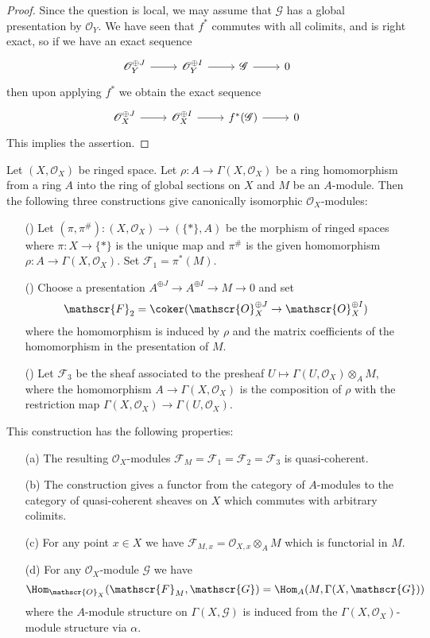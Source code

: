 \begin{proof}
Since the question is local, we may assume that $\mathscr{G}$ has a global presentation by $\mathscr{O}_Y$. We have seen that $f^*$ commutes with all colimits, and is right exact, so if we have an exact sequence
\[\begin{tikzcd}
\mathscr{O}_Y^{\oplus J}\ar[r]&\mathscr{O}_Y^{\oplus I}\ar[r]&\mathscr{G}\ar[r]&0
\end{tikzcd}\]
then upon applying $f^*$ we obtain the exact sequence
\[\begin{tikzcd}
\mathscr{O}_X^{\oplus J}\ar[r]&\mathscr{O}_X^{\oplus I}\ar[r]&f^*(\mathscr{G})\ar[r]&0
\end{tikzcd}\]
This implies the assertion.
\end{proof}
\begin{proposition}\label{qcoh module associated with a module}
Let $(X,\mathscr{O}_X)$ be ringed space. Let $\rho:A\to\Gamma(X,\mathscr{O}_X)$ be a ring homomorphism from a ring $A$ into the ring of global sections on $X$ and $M$ be an $A$-module. Then the following three constructions give canonically isomorphic $\mathscr{O}_X$-modules:
\begin{itemize}
\item[(\rmnum{1})] Let $(\pi,\pi^{\#}):(X,\mathscr{O}_X)\to(\{\ast\},A)$ be the morphism of ringed spaces where $\pi:X\to\{\ast\}$ is the unique map and $\pi^{\#}$ is the given homomorphism $\rho:A\to\Gamma(X,\mathscr{O}_X)$. Set $\mathscr{F}_1=\pi^*(M)$.
\item[(\rmnum{2})] Choose a presentation $A^{\oplus J}\to A^{\oplus I}\to M\to 0$ and set
\[\mathscr{F}_2=\coker(\mathscr{O}_X^{\oplus J}\to\mathscr{O}_X^{\oplus I})\]
where the homomorphism is induced by $\rho$ and the matrix coefficients of the homomorphism in the presentation of $M$.
\item[(\rmnum{3})] Let $\mathscr{F}_3$ be the sheaf associated to the presheaf $U\mapsto\Gamma(U,\mathscr{O}_X)\otimes_AM$, where the homomorphism $A\to\Gamma(X,\mathscr{O}_X)$ is the composition of $\rho$ with the restriction map $\Gamma(X,\mathscr{O}_X)\to\Gamma(U,\mathscr{O}_X)$.
\end{itemize}
This construction has the following properties:
\begin{itemize}
\item[(a)] The resulting $\mathscr{O}_X$-modules $\mathscr{F}_M=\mathscr{F}_1=\mathscr{F}_2=\mathscr{F}_3$ is quasi-coherent.
\item[(b)] The construction gives a functor from the category of $A$-modules to the category of quasi-coherent sheaves on $X$ which commutes with arbitrary colimits.
\item[(c)] For any point $x\in X$ we have $\mathscr{F}_{M,x}=\mathscr{O}_{X,x}\otimes_AM$ which is functorial in $M$.
\item[(d)] For any $\mathscr{O}_X$-module $\mathscr{G}$ we have
\[\Hom_{\mathscr{O}_X}(\mathscr{F}_M,\mathscr{G})=\Hom_A(M,\Gamma(X,\mathscr{G}))\]
where the $A$-module structure on $\Gamma(X,\mathscr{G})$ is induced from the $\Gamma(X,\mathscr{O}_X)$-module structure via $\alpha$.
\end{itemize}
\end{proposition}
